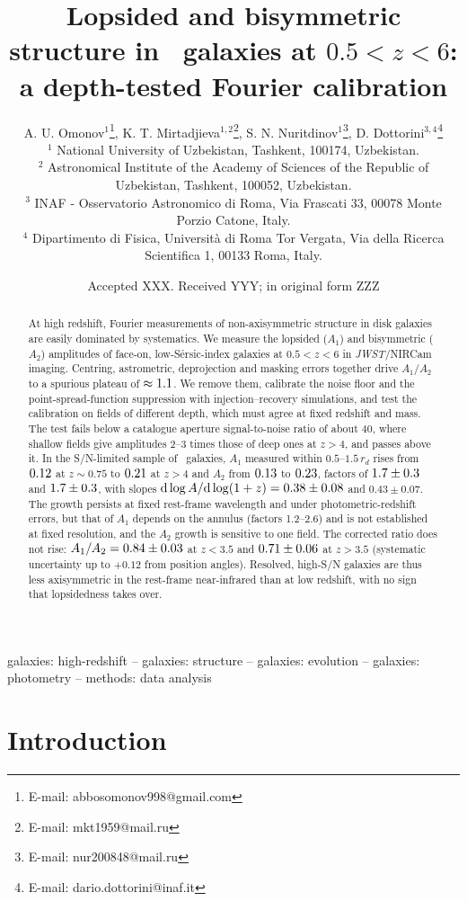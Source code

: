 \documentclass[fleqn,usenatbib]{mnras}
\title[Lopsided and bisymmetric structure in \JWST\ galaxies]{Lopsided and
bisymmetric structure in \JWST\ galaxies at $0.5<z<6$: a depth-tested Fourier
calibration}
\author[A. U. Omonov et al.]{%
    A. U. Omonov$^{1}$\thanks{E-mail: abbosomonov998@gmail.com}\orcidlink{0009-0006-7897-1255}, K. T. Mirtadjieva$^{1,2}$\thanks{E-mail: mkt1959@mail.ru}\orcidlink{0000-0002-1172-9054}, S. N. Nuritdinov$^{1}$\thanks{E-mail: nur200848@mail.ru}, D. Dottorini$^{3,4}$\thanks{E-mail: dario.dottorini@inaf.it}\orcidlink{0009-0004-5511-3309}\\
  $^{1}$ National University of Uzbekistan, Tashkent, 100174, Uzbekistan.\\
   $^{2}$ Astronomical Institute of the Academy of Sciences of the Republic of Uzbekistan, Tashkent, 100052, Uzbekistan.\\
   $^{3}$ INAF - Osservatorio Astronomico di Roma, Via Frascati 33,
  00078 Monte Porzio Catone, Italy.\\
   $^{4}$ Dipartimento di Fisica, Universit\`a di Roma Tor Vergata,
  Via della Ricerca Scientifica 1, 00133 Roma, Italy.
}
\date{Accepted XXX. Received YYY; in original form ZZZ}
\newcommand{\JWST}{\textit{JWST}}
\begin{document}
\label{firstpage}
\pagerange{\pageref{firstpage}--\pageref{lastpage}}
\maketitle


\begin{abstract}
At high redshift, Fourier measurements of non-axisymmetric structure in disk
galaxies are easily dominated by systematics. We measure the lopsided ($A_1$)
and bisymmetric ($A_2$) amplitudes of face-on, low-S\'ersic-index galaxies at
$0.5<z<6$ in \JWST/NIRCam imaging. Centring, astrometric, deprojection
and masking errors together drive $A_1/A_2$ to a spurious plateau of
$\approx1.1$. We remove them, calibrate the noise floor and
the point-spread-function suppression with injection--recovery simulations, and
test the calibration on fields of different depth, which must agree at fixed
redshift and mass. The test
fails below a catalogue aperture signal-to-noise ratio of about 40, where shallow fields
give amplitudes 2--3 times those of deep ones at $z>4$, and passes above it. In the S/N-limited sample of \numNvalid\ galaxies, $A_1$ measured within
$0.5$--$1.5\,r_d$ rises from $0.12$ at $z\sim0.75$ to $0.21$ at
$z>4$ and $A_2$ from $0.13$ to $0.23$, factors of
$1.7\pm0.3$ and $1.7\pm0.3$, with slopes
${\rm d}\log A/{\rm d}\log(1+z)=0.38\pm0.08$ and $0.43\pm0.07$. The growth
persists at fixed rest-frame wavelength and under photometric-redshift errors,
but that of $A_1$ depends on the annulus (factors 1.2--2.6) and is not
established at fixed resolution, and the $A_2$ growth is sensitive to one field. The corrected ratio does not rise:
$A_1/A_2=0.84\pm0.03$ at $z<3.5$ and
$0.71\pm0.06$ at $z>3.5$ (systematic uncertainty up to $+0.12$
from position angles). Resolved, high-S/N galaxies are thus less axisymmetric in the rest-frame
near-infrared than at low redshift, with no sign that lopsidedness takes over.
\end{abstract}

\begin{keywords}
galaxies: high-redshift -- galaxies: structure -- galaxies: evolution --
galaxies: photometry -- methods: data analysis
\end{keywords}

\section{Introduction}\label{sec:intro}
\end{document}
